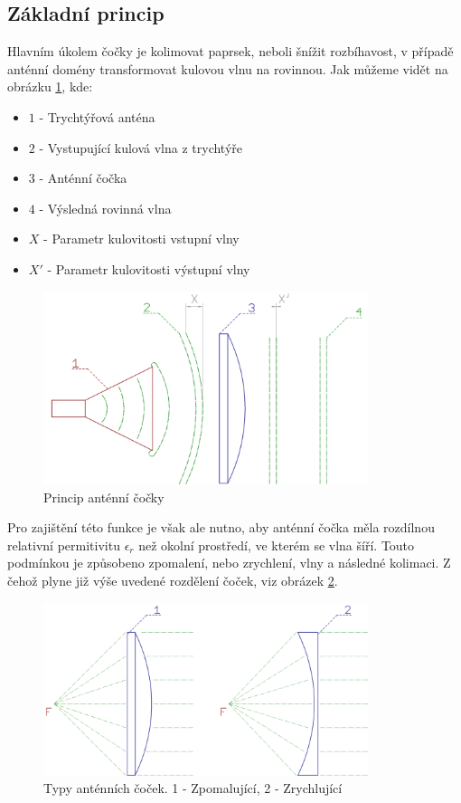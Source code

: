 \subsection{Základní princip}
Hlavním úkolem čočky je kolimovat paprsek, neboli šnížit rozbíhavost, v případě anténní domény transformovat kulovou vlnu na rovinnou. Jak můžeme vidět na obrázku \ref{fig:hornLens}, kde:
\begin{itemize}
\item $1$ - Trychtýřová anténa
\item $2$ - Vystupující kulová vlna z trychtýře
\item $3$ - Anténní čočka
\item $4$ - Výsledná rovinná vlna
\item $X$ - Parametr kulovitosti vstupní vlny
\item $X'$ - Parametr kulovitosti výstupní vlny
\end{itemize}
\begin{figure}[h]
\begin{center}
\includegraphics[width=9.5cm]{pics/lens}
\caption{Princip anténní čočky}
\label{fig:hornLens}
\end{center}
\end{figure}
Pro zajištění této funkce je však ale nutno, aby anténní čočka měla rozdílnou relativní permitivitu $\epsilon_r$ než okolní prostředí, ve kterém se vlna šíří. Touto podmínkou je způsobeno zpomalení, nebo zrychlení, vlny a následné kolimaci. Z čehož plyne již výše uvedené rozdělení čoček, viz obrázek \ref{fig:LensTypes}.
\begin{figure}[h]
\begin{center}
\includegraphics[width=9.5cm]{pics/lenstypes}
\caption{Typy anténních čoček. 1 - Zpomalující, 2 - Zrychlující}
\label{fig:LensTypes}
\end{center}
\end{figure}

